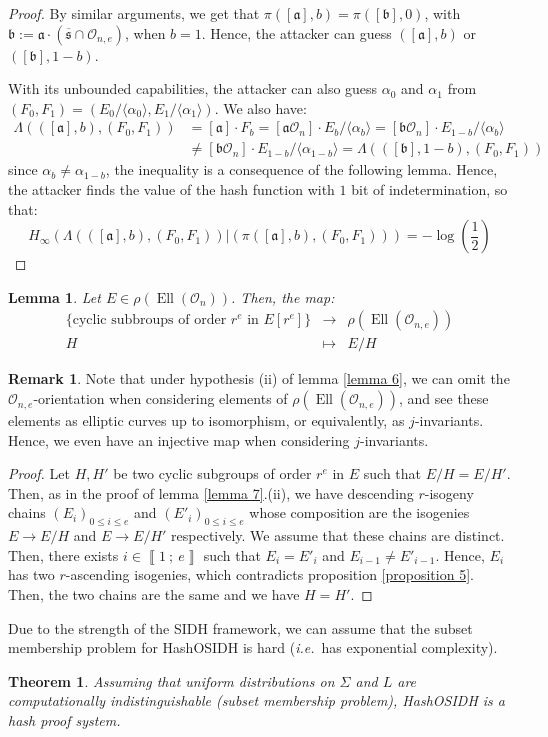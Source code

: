 \documentclass[a4paper,10pt]{report}
\theoremstyle{definition}
\theoremstyle{plain}
\newtheorem{lemma}[definition]{Lemma}
\newtheorem{theorem}[definition]{Theorem}
\theoremstyle{definition}
\newtheorem{remark}[definition]{Remark}
\newcommand{\ie}{\emph{i.e.}\ }
\newcommand{\mO}{\mathcal{O}}
\renewcommand{\i}[2]{\left\llbracket #1~;~#2\right\rrbracket}
\renewcommand{\(}{\left(}
\renewcommand{\)}{\right)}
\newcommand{\mf}[1]{\mathfrak{#1}}
\DeclareMathOperator{\Ell}{Ell}
\begin{document}
\begin{proof}
By similar arguments, we get that $\pi([\mf{a}],b)=\pi([\mf{b}],0)$, with $\mf{b}:=\mf{a}\cdot(\overline{\mf{s}}\cap\mO_{n,e})$, when $b=1$. Hence, the attacker can guess $([\mf{a}],b)$ or $([\mf{b}],1-b)$.

With its unbounded capabilities, the attacker can also guess $\alpha_0$ and $\alpha_1$ from $(F_0,F_1)=(E_0/\langle\alpha_0\rangle, E_1/\langle\alpha_1\rangle)$.  We also have:
\begin{align*}\Lambda(([\mf{a}],b),(F_0,F_1))&=[\mf{a}]\cdot F_b=[\mf{a}\mO_n]\cdot E_b/\langle\alpha_b\rangle=[\mf{b}\mO_n]\cdot E_{1-b}/\langle\alpha_b\rangle\\
&\neq [\mf{b}\mO_n]\cdot E_{1-b}/\langle\alpha_{1-b}\rangle=\Lambda(([\mf{b}],1-b),(F_0,F_1))
\end{align*}
since $\alpha_b\neq\alpha_{1-b}$, the inequality is a consequence of the following lemma. Hence, the attacker finds the value of the hash function with $1$ bit of indetermination, so that:
\[H_\infty(\Lambda(([\mf{a}],b),(F_0,F_1))|(\pi([\mf{a}],b),(F_0,F_1)))=-\log\(\frac{1}{2}\)\]
\end{proof}

\begin{lemma}
Let $E\in \rho(\Ell(\mO_n))$. Then, the map:
\[\begin{array}{rcl}
\{\mbox{cyclic subbroups of order } r^e \mbox{ in } E[r^e]\}& \longrightarrow & \rho(\Ell(\mO_{n,e}))\\
H & \longmapsto & E/H 
\end{array}\]
\end{lemma}

\begin{remark}
Note that under hypothesis (ii) of lemma \ref{lemma 6},  we can omit the $\mO_{n,e}$-orientation when considering elements of $\rho(\Ell(\mO_{n,e}))$, and see these elements as elliptic curves up to isomorphism, or equivalently, as $j$-invariants.  Hence, we even have an injective map when considering $j$-invariants.
\end{remark}

\begin{proof}
Let $H, H'$ be two cyclic subgroups of order $r^e$ in $E$ such that $E/H=E/H'$. Then, as in the proof of lemma \ref{lemma 7}.(ii), we have descending $r$-isogeny chains $(E_i)_{0\leq i\leq e}$ and $(E'_i)_{0\leq i\leq e}$ whose composition are the isogenies $E\longrightarrow E/H$ and $E\longrightarrow E/H'$ respectively. We assume that these chains are distinct. Then, there exists $i\in\i{1}{e}$ such that $E_i=E'_i$ and $E_{i-1}\neq E'_{i-1}$. Hence, $E_i$ has two $r$-ascending isogenies, which contradicts proposition \ref{proposition 5}. Then, the two chains are the same and we have $H=H'$.
\end{proof}

Due to the strength of the SIDH framework, we can assume that the subset membership problem for HashOSIDH is hard (\ie has exponential complexity).

\begin{theorem}
Assuming that uniform distributions on $\Sigma$ and $L$ are computationally indistinguishable (subset membership problem), HashOSIDH is a hash proof system.
\end{theorem}
\end{document}
